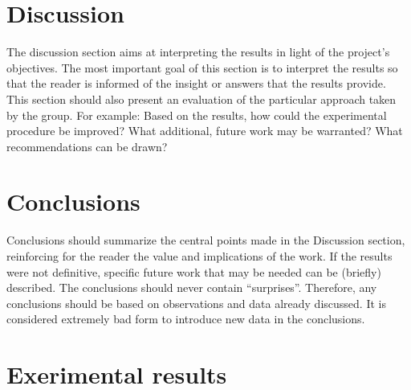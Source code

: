 \section{Discussion}
The discussion section aims at interpreting the results in light of the project's objectives. The most important goal of this section is to interpret the results so that the reader is informed of the insight or answers that the results provide. This section should also present an evaluation of the particular approach taken by the group. For example: Based on the results, how could the experimental procedure be improved? What additional, future work may be warranted? What recommendations can be drawn?


\section{Conclusions}
Conclusions should summarize the central points made in the Discussion section, reinforcing for the reader the value and implications of the work. If the results were not definitive, specific future work that may be needed can be (briefly) described. The conclusions should never contain ``surprises''. Therefore, any conclusions should be based on observations and data already discussed. It is considered extremely bad form to introduce new data in the conclusions.













\newpage
\appendix
\section{Exerimental results}

